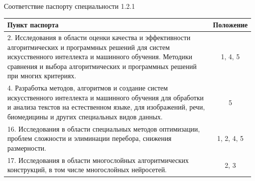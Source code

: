 \documentclass[9pt,pdf,hyperref={unicode}]{beamer}
\begin{document}
\begin{frame}{Соответствие паспорту специальности 1.2.1}
\justifying
\begin{center}
\begin{tabular}{|p{}|c|}
\hline
\textbf{Пункт паспорта} & \textbf{Положение} \\
\hline
2. Исследования в области оценки качества и эффективности алгоритмических и программных решений для систем искусственного интеллекта и машинного обучения. Методики сравнения и выбора алгоритмических и программных решений при многих критериях. & 1, 4, 5 \\
\hline
4. Разработка методов, алгоритмов и создание систем искусственного интеллекта и машинного обучения для обработки и анализа текстов на естественном языке, для изображений, речи, биомедицины и других специальных видов данных. & 5 \\
\hline
16. Исследования в области специальных методов оптимизации, проблем сложности и элиминации перебора, снижения размерности. & 1, 2, 4, 5 \\
\hline
17. Исследования в области многослойных алгоритмических конструкций, в том числе многослойных нейросетей. & 2, 3 \\
\hline
\end{tabular}
\end{center}
\end{frame}
\end{document}
